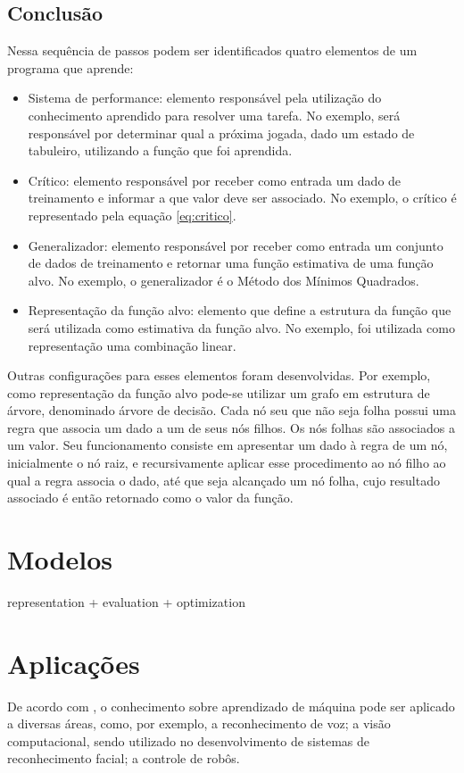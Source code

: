 \subsection*{Conclusão}

Nessa sequência de passos podem ser identificados quatro elementos de um programa que aprende:

\begin{itemize}
\item Sistema de performance: elemento responsável pela utilização do conhecimento aprendido para resolver uma tarefa. No exemplo, será responsável por determinar qual a próxima jogada, dado um estado de tabuleiro, utilizando a função que foi aprendida. 
\item Crítico: elemento responsável por receber como entrada um dado de treinamento e informar a que valor deve ser associado. No exemplo, o crítico é representado pela equação \ref{eq:critico}.
\item Generalizador: elemento responsável por receber como entrada um conjunto de dados de treinamento e retornar uma função estimativa de uma função alvo. No exemplo, o generalizador é o Método dos Mínimos Quadrados.
\item Representação da função alvo: elemento que define a estrutura da função que será utilizada como estimativa da função alvo. No exemplo, foi utilizada como representação uma combinação linear.
\end{itemize}

Outras configurações para esses elementos foram desenvolvidas. Por exemplo, como representação da função alvo pode-se utilizar um grafo em estrutura de árvore, denominado árvore de decisão. Cada nó seu que não seja folha possui uma regra que associa um dado a um de seus nós filhos. Os nós folhas são associados a um valor. Seu funcionamento consiste em apresentar um dado à regra de um nó, inicialmente o nó raiz, e recursivamente aplicar esse procedimento ao nó filho ao qual a regra associa o dado, até que seja alcançado um nó folha, cujo resultado associado é então retornado como o valor da função.

\section{Modelos}
representation + evaluation + optimization \cite{ML_know}

\section{Aplicações}

De acordo com \cite{Mitchell_discipline}, o conhecimento sobre aprendizado de máquina pode ser aplicado a diversas áreas, como, por exemplo, a reconhecimento de voz; a visão computacional, sendo utilizado no desenvolvimento de sistemas de reconhecimento facial; a controle de robôs.